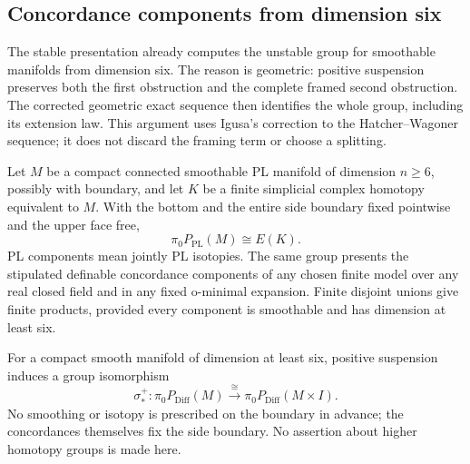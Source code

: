 \subsection{Concordance components from dimension six}

The stable presentation already computes the unstable group for
smoothable manifolds from dimension six. The reason is geometric:
positive suspension preserves both the first obstruction and the
complete framed second obstruction. The corrected geometric exact
sequence then identifies the whole group, including its extension
law. This argument uses Igusa's correction to the
Hatcher--Wagoner sequence; it does not discard the framing term or
choose a splitting.

\begin{theorem}\label{thm:smoothable-concordance-six}
Let $M$ be a compact connected smoothable PL manifold of dimension
$n\geq6$, possibly with boundary, and let $K$ be a finite simplicial
complex homotopy equivalent to $M$. With the bottom and the entire
side boundary fixed pointwise and the upper face free,
\[
                     \pi_0P_{\mathrm{PL}}(M)\cong E(K).
\]
PL components mean jointly PL isotopies. The same group presents
the stipulated definable concordance components of any chosen
finite model over any real closed field and in any fixed o-minimal
expansion. Finite disjoint unions give finite products, provided
every component is smoothable and has dimension at least six.

For a compact smooth manifold of dimension at least six, positive
suspension induces a group isomorphism
\[
 \sigma^+_*:\pi_0P_{\mathrm{Diff}}(M)
       \xrightarrow{\ \cong\ }\pi_0P_{\mathrm{Diff}}(M\times I).
\]
No smoothing or isotopy is prescribed on the boundary in advance;
the concordances themselves fix the side boundary. No assertion
about higher homotopy groups is made here.
\end{theorem}

